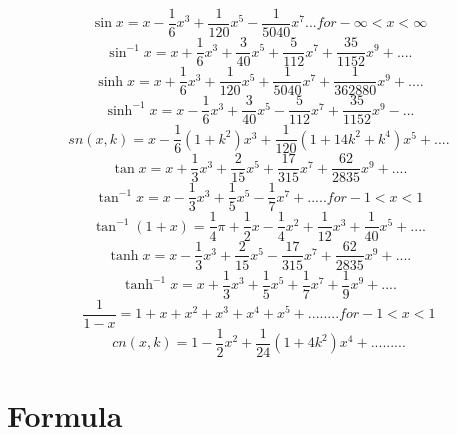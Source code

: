 \begin{equation}
\sin x = x - \frac{1}{6} x^3 + \frac{1}{120} x^5 - \frac{1}{5040} x^7 ... for - \infty < x < \infty 
\end{equation}
\begin{equation}
\sin^{-1} x = x + \frac{1}{6} x^3 + \frac{3}{40} x^5 + \frac{5}{112} x^7 + \frac{35}{1152} x^9 + ....
\end{equation}
\begin{equation}
\sinh x = x + \frac{1}{6} x^3 + \frac{1}{120} x^5 + \frac{1}{5040} x^7 + \frac{1}{362880} x^9 + ....
\end{equation}
\begin{equation}
\sinh^{-1} x = x - \frac{1}{6} x^3 + \frac{3}{40} x^5 - \frac{5}{112} x^7 + \frac{35}{1152} x^9 -  ...
\end{equation}
\begin{equation}
sn(x,k) = x - \frac{1}{6}(1+k^2) x^3 + \frac{1}{120} (1 + 14k^2 + k^4) x^5 + .... 
\end{equation}
\begin{equation}
\tan x = x + \frac{1}{3} x^3 + \frac{2}{15} x^5 + \frac{17}{315} x^7 + \frac{62}{2835} x^9 + ....
\end{equation}
\begin{equation}
\tan^{-1} x= x - \frac{1}{3} x^3 + \frac{1}{5} x^5 - \frac{1}{7} x^7 + ..... for -1 < x < 1 
\end{equation}
\begin{equation}
\tan^{-1}(1+x) = \frac{1}{4} \pi + \frac{1}{2} x - \frac{1}{4} x^2 + \frac{1}{12} x ^3 + \frac{1}{40} x^5 + ....
\end{equation}
\begin{equation}
\tanh x = x - \frac{1}{3} x^3 + \frac{2}{15} x^5 - \frac{17}{315} x^7 + \frac{62}{2835} x^9 + ....
\end{equation}
\begin{equation}
\tanh^{-1} x = x + \frac{1}{3} x^3 + \frac{1}{5} x^5 + \frac{1}{7} x^7 + \frac{1}{9} x^{9} + ....
\end{equation}
\begin{equation}
\frac{1}{1-x}=1+x+x^{2}+x^{3}+x^{4}+x^{5}+........for -1<x<1 
\end{equation}
\begin{equation}
cn(x,k)=1-\frac{1}{2}x^{2}+\frac{1}{24}(1+4k^{2})x^{4}+.........
\end{equation}

\section{Formula}
